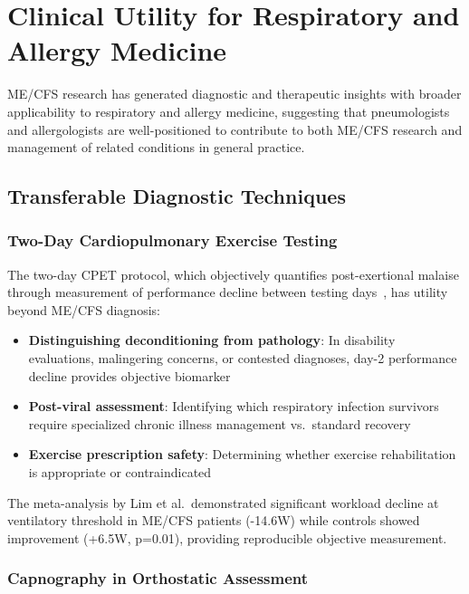 \section{Clinical Utility for Respiratory and Allergy Medicine}
\label{sec:clinical-utility-specialists}

ME/CFS research has generated diagnostic and therapeutic insights with broader applicability to respiratory and allergy medicine, suggesting that pneumologists and allergologists are well-positioned to contribute to both ME/CFS research and management of related conditions in general practice.

\subsection{Transferable Diagnostic Techniques}

\subsubsection{Two-Day Cardiopulmonary Exercise Testing}

The two-day CPET protocol, which objectively quantifies post-exertional malaise through measurement of performance decline between testing days~\cite{Lim2020}, has utility beyond ME/CFS diagnosis:

\begin{itemize}
    \item \textbf{Distinguishing deconditioning from pathology}: In disability evaluations, malingering concerns, or contested diagnoses, day-2 performance decline provides objective biomarker
    \item \textbf{Post-viral assessment}: Identifying which respiratory infection survivors require specialized chronic illness management vs.\ standard recovery
    \item \textbf{Exercise prescription safety}: Determining whether exercise rehabilitation is appropriate or contraindicated
\end{itemize}

The meta-analysis by Lim et al.\ demonstrated significant workload decline at ventilatory threshold in ME/CFS patients (-14.6W) while controls showed improvement (+6.5W, p=0.01), providing reproducible objective measurement.

\subsubsection{Capnography in Orthostatic Assessment}

